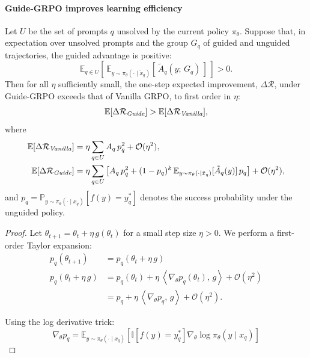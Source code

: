 \documentclass{article}
\newtheorem{proof}{Proof}
\begin{document}
{\paragraph{Guide-GRPO improves learning efficiency}
Let \(U\) be the set of prompts \(q\) unsolved by the current policy \(\pi_\theta\). Suppose that, in expectation over unsolved prompts and the group $G_q$ of guided and unguided trajectories, the guided advantage is positive:
\[
\mathbb{E}_{q \in U} \left[\, \mathbb{E}_{y \sim \pi_\theta(\cdot \mid \tilde{x}_q)} \left[\, \tilde{A}_q(y;\, G_q) \,\right] \,\right] > 0.
\]
Then for all \(\eta\) sufficiently small, the one-step expected improvement, \(\Delta \mathcal{R}\), under Guide-GRPO exceeds that of Vanilla GRPO, to first order in \(\eta\):
\vspace{0.5em}
\begin{equation}
\mathbb{E}[\Delta\mathcal{R}_{\text{\emph{Guide}}}] > \mathbb{E}[\Delta\mathcal{R}_{\text{\emph{Vanilla}}}],
\end{equation}
\vspace{0.25em}
where
\begin{align}
\mathbb{E}[\Delta\mathcal{R}_{\text{\emph{Vanilla}}}] &= \eta \sum_{q \in U} A_q\, p_q^2 + \mathcal{O}(\eta^2), \\
\mathbb{E}[\Delta\mathcal{R}_{\text{\emph{Guide}}}] &= \eta \sum_{q \in U} \left[ A_q\, p_q^2 + (1 - p_q)^k\, \mathbb{E}_{y \sim \pi_\theta(\cdot \mid \tilde x_q)}[\tilde A_q(y)]\, p_q \right] + \mathcal{O}(\eta^2),
\end{align}
and \(p_q = \mathbb{P}_{y \sim \pi_\theta(\cdot \mid x_q)}\left[f(y) = y_q^*\right]\) denotes the success probability under the unguided policy.

\begin{proof}
Let $\theta_{t+1} = \theta_t + \eta\, g(\theta_t)$ for a small step size $\eta > 0$.  
We perform a first-order Taylor expansion:
\begin{align}
\label{eq:taylor_1} p_q(\theta_{t+1}) &= p_q(\theta_t + \eta\, g) \\
\label{eq:taylor_2} 
p_q(\theta_t + \eta\, g) &= p_q(\theta_t) + \eta\, \left\langle \nabla_\theta p_q(\theta_t),\, g \right\rangle + \mathcal{O}(\eta^2) \\
\label{eq:taylor_3} 
&= p_q + \eta\, \left\langle \nabla_\theta p_q,\, g \right\rangle + \mathcal{O}(\eta^2).
\end{align}

Using the log derivative trick:
\begin{equation}
\label{eq:log_derivative}
\nabla_\theta p_q = \mathbb{E}_{y \sim \pi_\theta(\cdot \mid x_q)} \left[ \mathbb{I}[f(y) = y_q^*] \nabla_\theta \log \pi_\theta(y \mid x_q) \right]
\end{equation}


\end{proof}}
\end{document}
